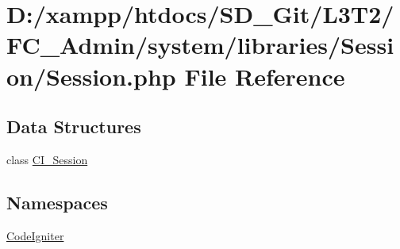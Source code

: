 \hypertarget{_admin_2system_2libraries_2_session_2_session_8php}{}\section{D\+:/xampp/htdocs/\+S\+D\+\_\+\+Git/\+L3\+T2/\+F\+C\+\_\+\+Admin/system/libraries/\+Session/\+Session.php File Reference}
\label{_admin_2system_2libraries_2_session_2_session_8php}
\subsection*{Data Structures}
\begin{DoxyCompactItemize}
\item 
class \hyperlink{class_c_i___session}{C\+I\+\_\+\+Session}
\end{DoxyCompactItemize}
\subsection*{Namespaces}
\begin{DoxyCompactItemize}
\item 
 \hyperlink{namespace_code_igniter}{Code\+Igniter}
\end{DoxyCompactItemize}
